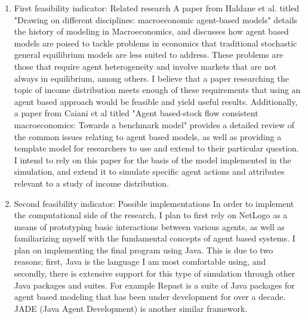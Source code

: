 \documentclass[11pt]{article}
\begin{document}
\begin{enumerate}
  \item First feasibility indicator: Related research
A paper from Haldane et al. titled "Drawing on different disciplines: macroeconomic agent-based models" details
the history of modeling in Macroeconomics, and discusses how agent based models are poised to tackle problems in
economics that traditional stochastic general equilibrium models are less suited to address. These problems are
those that require agent heterogeneity and involve markets that are not always in equilibrium, among others. I believe that
a paper researching the topic of income distribution meets enough of these requirements that using an agent based
approach would be feasible and yield useful results. Additionally, a paper from Caiani et al titled "Agent based-stock
flow consistent macroeconomics: Towards a benchmark model" provides a detailed review of the common issues relating to
agent based models, as well as providing a template model for researchers to use and extend to their particular question.
I intend to rely on this paper for the basis of the model implemented in the simulation, and extend it to simulate specific
agent actions and attributes relevant to a study of income distribution.
  \item Second feasibility indicator: Possible implementations
In order to implement the computational side of the research, I plan to first rely on NetLogo as a means of prototyping
basic interactions between various agents, as well as familiarizing myself with the fundamental concepts of agent based
systems. I plan on implementing the final program using Java. This is due to two reasons; first, Java is the language I am
most comfortable using, and secondly, there is extensive support for this type of simulation through other Java packages and
suites. For example Repast is a suite of Java packages for agent based modeling that has been under development for over a decade.
JADE (Java Agent Development) is another similar framework.
  \end{enumerate}
\end{document}
